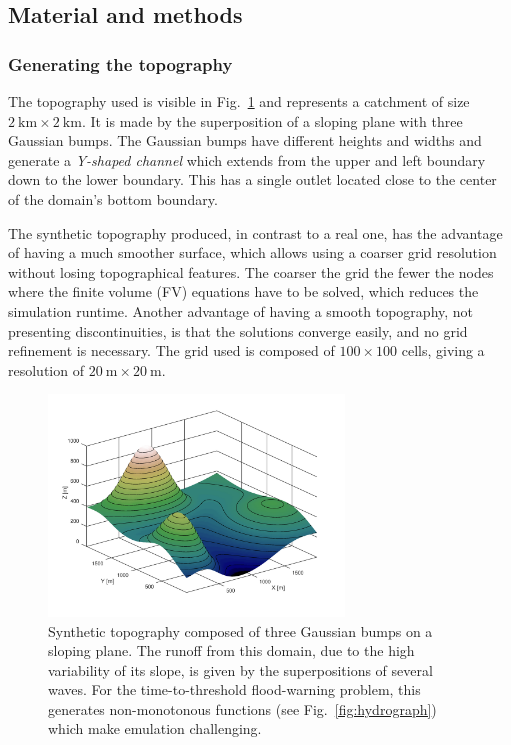 \subsection{Material and methods}
\subsubsection{Generating the topography}

The topography used is visible in Fig.~\ref{fig:topography} and represents a catchment of size $\SI{2}{\kilo\meter} \times \SI{2}{\kilo\meter}$.
It is made by the superposition of a sloping plane with three Gaussian bumps.
The Gaussian bumps have different heights and widths and generate a \emph{Y-shaped channel} which extends from the upper and left boundary down to the lower boundary.
This has a single outlet located close to the center of the domain's bottom boundary.

The synthetic topography produced, in contrast to a real one, has the advantage of having a much smoother surface, which allows using a coarser grid resolution without losing topographical features.
The coarser the grid the fewer the nodes where the finite volume (FV) equations have to be solved, which reduces the simulation runtime.
Another advantage of having a smooth topography, not presenting discontinuities, is that the solutions converge easily, and no grid refinement is necessary.
The grid used is composed of $\num{100} \times \num{100}$ cells, giving a resolution of $\SI{20}{\meter} \times \SI{20}{\meter}.$

\begin{figure}[h]
  \centering
  \includegraphics[width=0.7\textwidth]{Figures/topography.png}
  \caption{Synthetic topography composed of three Gaussian bumps on a sloping plane. The runoff from this domain, due to the high variability of its slope, is given by the superpositions of several waves. For the time-to-threshold flood-warning problem, this generates non-monotonous functions (see Fig.~\ref{fig:hydrograph}) which make emulation challenging.}
  \label{fig:topography}
\end{figure}

